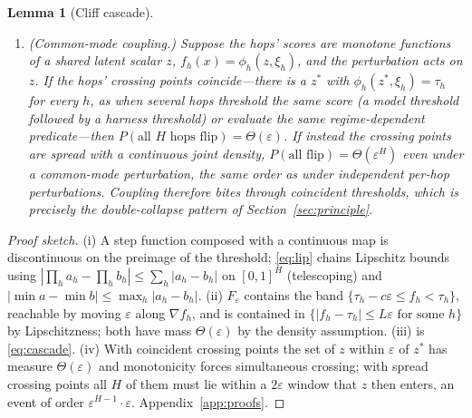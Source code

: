 \documentclass[11pt,a4paper]{article}
\numberwithin{equation}{section}
\theoremstyle{plain}
\newtheorem{lemma}{Lemma}
\theoremstyle{definition}
\theoremstyle{remark}
\begin{document}
\begin{lemma}[Cliff cascade]
\begin{enumerate}[label=(\roman*),leftmargin=2em]
\begin{equation}\label{eq:cascade}
\begin{aligned}
q_{h+1} &:= \inf_{\varepsilon>0}\,P\bigl(a_{h+1}\text{ flips}\ \big|\ a_h\text{ flips}\bigr)\\
&\ \ge\ \inf_{\varepsilon>0}\,P_X\bigl(\tau_{h+1}-c'\le f_{h+1}(x,0)<\tau_{h+1}\ \big|\ |f_h(x)-\tau_h|\le\varepsilon\bigr) = \Theta(1).
\end{aligned}
\end{equation}
Conditional on the first hop flipping, the expected number of further flips is at least $\sum_{h=2}^{H}\prod_{j=2}^{h}q_j$, which does not vanish as $\varepsilon\to0$. In the sequential fuzzy pipeline hop $h{+}1$ receives $\mu_h$ in place of $a_h$; if each $f_{h+1}$ is $L$-Lipschitz in its full input, the recursion gives $|\Delta\mu_h|\le(\sum_{j\le h}L^j)\varepsilon$ and a total action change of at most $L_D\,H\sum_{h=1}^{H}L^h\,\varepsilon$: geometric in $L$, still $O(\varepsilon)$.
\item \textup{(Common-mode coupling.)} Suppose the hops' scores are monotone functions of a shared latent scalar $z$, $f_h(x)=\phi_h(z,\xi_h)$, and the perturbation acts on $z$. If the hops' crossing points coincide---there is a $z^\ast$ with $\phi_h(z^\ast,\xi_h)=\tau_h$ for every $h$, as when several hops threshold the same score (a model threshold followed by a harness threshold) or evaluate the same regime-dependent predicate---then $P(\text{all } H \text{ hops flip})=\Theta(\varepsilon)$. If instead the crossing points are spread with a continuous joint density, $P(\text{all flip})=\Theta(\varepsilon^H)$ even under a common-mode perturbation, the same order as under independent per-hop perturbations. Coupling therefore bites through \emph{coincident thresholds}, which is precisely the double-collapse pattern of Section~\ref{sec:principle}.
\end{enumerate}
\end{lemma}

\begin{proof}[Proof sketch]
(i) A step function composed with a continuous map is discontinuous on the preimage of the threshold; \eqref{eq:lip} chains Lipschitz bounds using $|\prod_h a_h-\prod_h b_h|\le\sum_h|a_h-b_h|$ on $[0,1]^H$ (telescoping) and $|\min a-\min b|\le\max_h|a_h-b_h|$. (ii) $F_\varepsilon$ contains the band $\{\tau_h-c\varepsilon\le f_h<\tau_h\}$, reachable by moving $\varepsilon$ along $\nabla f_h$, and is contained in $\{|f_h-\tau_h|\le L\varepsilon \text{ for some } h\}$ by Lipschitzness; both have mass $\Theta(\varepsilon)$ by the density assumption. (iii) is \eqref{eq:cascade}. (iv) With coincident crossing points the set of $z$ within $\varepsilon$ of $z^\ast$ has measure $\Theta(\varepsilon)$ and monotonicity forces simultaneous crossing; with spread crossing points all $H$ of them must lie within a $2\varepsilon$ window that $z$ then enters, an event of order $\varepsilon^{H-1}\cdot\varepsilon$. Appendix~\ref{app:proofs}.
\end{proof}
\end{document}

